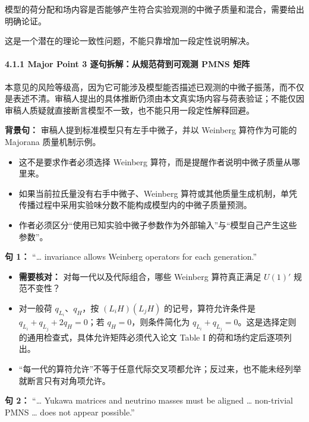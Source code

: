 \documentclass[
]{article}
\providecommand{\tightlist}{%
  \setlength{\itemsep}{0pt}\setlength{\parskip}{0pt}}
\begin{document}
模型的荷分配和场内容是否能够产生符合实验观测的中微子质量和混合，需要给出明确论证。

这是一个潜在的理论一致性问题，不能只靠增加一段定性说明解决。

\paragraph{4.1.1 Major Point 3 逐句拆解：从规范荷到可观测 PMNS
矩阵}\label{major-point-3-ux9010ux53e5ux62c6ux89e3ux4eceux89c4ux8303ux8377ux5230ux53efux89c2ux6d4b-pmns-ux77e9ux9635}

本意见的风险等级高，因为它可能涉及模型能否描述已观测的中微子振荡，而不仅是表述不清。审稿人提出的具体推断仍须由本文真实场内容与荷表验证；不能仅因审稿人质疑就直接断言模型不一致，也不能只用一段定性解释回避。

\textbf{背景句：} 审稿人提到标准模型只有左手中微子，并以 Weinberg
算符作为可能的 Majorana 质量机制示例。

\begin{itemize}
\tightlist
\item
  这不是要求作者必须选择 Weinberg
  算符，而是提醒作者说明中微子质量从哪里来。
\item
  如果当前拉氏量没有右手中微子、Weinberg
  算符或其他质量生成机制，单凭传播过程中采用实验味分数不能构成模型内的中微子质量预测。
\item
  作者必须区分``使用已知实验中微子参数作为外部输入''与``模型自己产生这些参数''。
\end{itemize}

\textbf{句 1：} ``\ldots{} invariance allows Weinberg operators for each
generation.''

\begin{itemize}
\tightlist
\item
  \textbf{需要核对：} 对每一代以及代际组合，哪些 Weinberg 算符真正满足
  \(U(1)'\) 规范不变性？
\item
  对一般荷 \(q_{L_i}\)、\(q_H\)，按 \((L_iH)(L_jH)\)
  的记号，算符允许条件是 \(q_{L_i}+q_{L_j}+2q_H=0\)；若
  \(q_H=0\)，则条件简化为
  \(q_{L_i}+q_{L_j}=0\)。这是选择定则的通用检查式，具体允许矩阵必须代入论文
  Table I 的荷和场约定后逐项列出。
\item
  ``每一代的算符允许''不等于任意代际交叉项都允许；反过来，也不能未经列举就断言只有对角项允许。
\end{itemize}

\textbf{句 2：} ``\ldots{} Yukawa matrices and neutrino masses must be
aligned \ldots{} non-trivial PMNS \ldots{} does not appear possible.''
\end{document}
